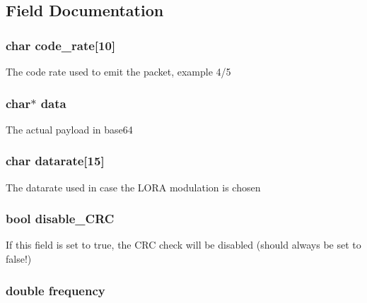 \subsection{Field Documentation}
\hypertarget{structdownstream__packet_a9bb17e8dc14670aedcd5b69e797d19d7}{
\subsubsection[{code\-\_\-rate}]{\setlength{\rightskip}{0pt plus 5cm}char code\-\_\-rate\mbox{[}10\mbox{]}}}\label{structdownstream__packet_a9bb17e8dc14670aedcd5b69e797d19d7}
The code rate used to emit the packet, example 4/5 \hypertarget{structdownstream__packet_a91a70b77df95bd8b0830b49a094c2acb}{
\subsubsection[{data}]{\setlength{\rightskip}{0pt plus 5cm}char$\ast$ data}}\label{structdownstream__packet_a91a70b77df95bd8b0830b49a094c2acb}
The actual payload in base64 \hypertarget{structdownstream__packet_a96f84d084cdf0e910c2482be0632fa97}{
\subsubsection[{datarate}]{\setlength{\rightskip}{0pt plus 5cm}char datarate\mbox{[}15\mbox{]}}}\label{structdownstream__packet_a96f84d084cdf0e910c2482be0632fa97}
The datarate used in case the L\-O\-R\-A modulation is chosen \hypertarget{structdownstream__packet_af235dcb1657075c3d7f13390ee408eea}{
\subsubsection[{disable\-\_\-\-C\-R\-C}]{\setlength{\rightskip}{0pt plus 5cm}bool disable\-\_\-\-C\-R\-C}}\label{structdownstream__packet_af235dcb1657075c3d7f13390ee408eea}
If this field is set to true, the C\-R\-C check will be disabled (should always be set to false!) \hypertarget{structdownstream__packet_a4c45cdff103e6644a620ba5061509f22}{
\subsubsection[{frequency}]{\setlength{\rightskip}{0pt plus 5cm}double frequency}}\label{structdownstream__packet_a4c45cdff103e6644a620ba5061509f22}
